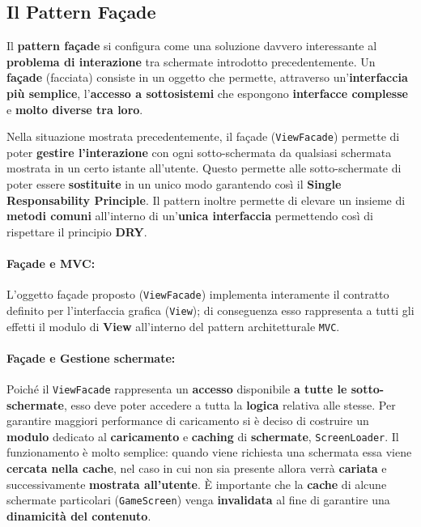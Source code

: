 \subsection{Il Pattern Façade}
Il \textbf{pattern façade} si configura come una soluzione davvero interessante al \textbf{problema di interazione} tra schermate introdotto precedentemente. Un \textbf{façade} (facciata) consiste in un oggetto che permette, attraverso un'\textbf{interfaccia più semplice}, l'\textbf{accesso a sottosistemi} che espongono \textbf{interfacce complesse} e \textbf{molto diverse tra loro}. 

Nella situazione mostrata precedentemente, il façade (\texttt{ViewFacade}) permette di poter \textbf{gestire l'interazione} con ogni sotto-schermata da qualsiasi schermata mostrata in un certo istante all'utente. Questo permette alle sotto-schermate di poter essere \textbf{sostituite} in un unico modo garantendo così il \textbf{Single Responsability Principle}. Il pattern inoltre permette di elevare un insieme di \textbf{metodi comuni} all'interno di un'\textbf{unica interfaccia} permettendo così di rispettare il principio \textbf{DRY}.

\paragraph{Façade e MVC:}
L'oggetto façade proposto (\texttt{ViewFacade}) implementa interamente il contratto definito per l'interfaccia grafica (\texttt{View}); di conseguenza esso rappresenta a tutti gli effetti il modulo di \textbf{View} all'interno del pattern architetturale \texttt{MVC}.

\paragraph{Façade e Gestione schermate:}
Poiché il \texttt{ViewFacade} rappresenta un \textbf{accesso} disponibile \textbf{a tutte le sotto-schermate}, esso deve poter accedere a tutta la \textbf{logica} relativa alle stesse. Per garantire maggiori performance di caricamento si è deciso di costruire un \textbf{modulo} dedicato al \textbf{caricamento} e \textbf{caching} di \textbf{schermate}, \texttt{ScreenLoader}. Il funzionamento è molto semplice: quando viene richiesta una schermata essa viene \textbf{cercata nella cache}, nel caso in cui non sia presente allora verrà \textbf{cariata} e successivamente \textbf{mostrata all'utente}. È importante che la \textbf{cache} di alcune schermate particolari (\texttt{GameScreen}) venga \textbf{invalidata} al fine di garantire una \textbf{dinamicità del contenuto}.


